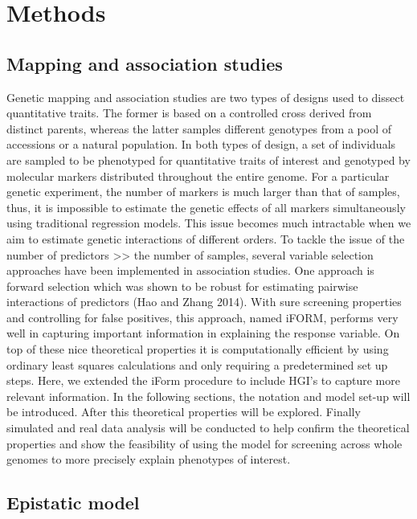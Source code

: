 \documentclass[]{book}
\theoremstyle{definition}
\theoremstyle{definition}
\theoremstyle{remark}
\begin{document}
\section{Methods}\label{methods-1}

\subsection{Mapping and association
studies}\label{mapping-and-association-studies}

Genetic mapping and association studies are two types of designs used to
dissect quantitative traits. The former is based on a controlled cross
derived from distinct parents, whereas the latter samples different
genotypes from a pool of accessions or a natural population. In both
types of design, a set of individuals are sampled to be phenotyped for
quantitative traits of interest and genotyped by molecular markers
distributed throughout the entire genome. For a particular genetic
experiment, the number of markers is much larger than that of samples,
thus, it is impossible to estimate the genetic effects of all markers
simultaneously using traditional regression models. This issue becomes
much intractable when we aim to estimate genetic interactions of
different orders. To tackle the issue of the number of predictors
\textgreater{}\textgreater{} the number of samples, several variable
selection approaches have been implemented in association studies. One
approach is forward selection which was shown to be robust for
estimating pairwise interactions of predictors (Hao and Zhang 2014).
With sure screening properties and controlling for false positives, this
approach, named iFORM, performs very well in capturing important
information in explaining the response variable. On top of these nice
theoretical properties it is computationally efficient by using ordinary
least squares calculations and only requiring a predetermined set up
steps. Here, we extended the iForm procedure to include HGI's to capture
more relevant information. In the following sections, the notation and
model set-up will be introduced. After this theoretical properties will
be explored. Finally simulated and real data analysis will be conducted
to help confirm the theoretical properties and show the feasibility of
using the model for screening across whole genomes to more precisely
explain phenotypes of interest.

\subsection{Epistatic model}\label{epistatic-model}
\end{document}
